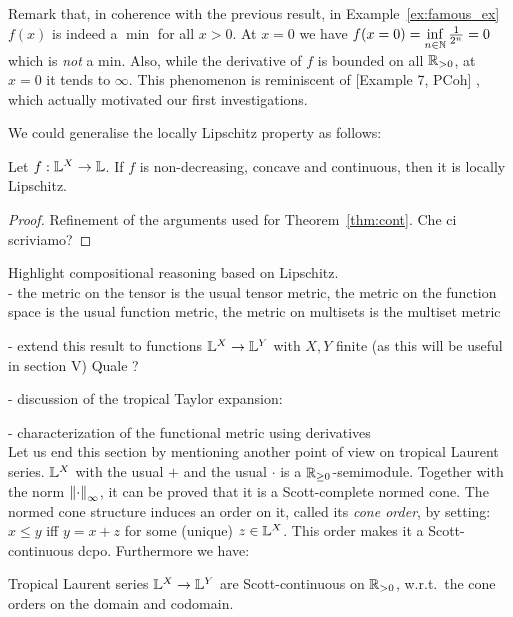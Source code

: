 Remark that, in coherence with the previous result, in Example~\ref{ex:famous_ex} $f(x)$ is indeed a $\min$ for all $x>0$.
At $x=0$ we have $f(x=0)=\inf\limits_{n\in\mathbb{N}} \frac{1}{2^n}=0$ which is \emph{not} a min.
Also, while the derivative of $f$ is bounded on all $\mathbb{R}_{>0}$, at $x=0$ it tends to $\infty$.
This phenomenon is reminiscent of [Example 7, PCoh]
, which actually motivated our first investigations.

We could generalise the locally Lipschitz property as follows:
\begin{theorem}
 Let $f:\mathbb{L}^X\to\mathbb{L}$.
 If $f$ is non-decreasing, concave and continuous, then it is locally Lipschitz.
\end{theorem}
\begin{proof}
 Refinement of the arguments used for Theorem~\ref{thm:cont}.
 {\color{red}Che ci scriviamo?}
\end{proof}

Highlight compositional reasoning based on Lipschitz.\\

- the metric on the tensor is the usual tensor metric, the metric on the function space is the usual function metric, the metric on multisets is the multiset metric

{\color{red}
- extend this result to functions $\mathbb{L}^{X}\to \mathbb{L}^{Y}$ with $X,Y$ finite (as this will be useful in section V) Quale ?} 



- discussion of the tropical Taylor expansion: 


- characterization of the functional metric using derivatives\\

Let us end this section by mentioning another point of view on tropical Laurent series.
$\mathbb{L}^X$ with the usual $+$ and the usual $\cdot$ is a $\mathbb{R}_{\geq0}$-semimodule.
Together with the norm $\left\lVert\cdot\right\rVert_\infty$, it can be proved that it is a Scott-complete normed cone.
The normed cone structure induces an order on it, called its \emph{cone order}, by setting:
$x\leq y$ iff $y=x+z$ for some (unique) $z\in\mathbb{L}^X$.
This order makes it a Scott-continuous dcpo.
Furthermore we have:

\begin{proposition}
  Tropical Laurent series $\mathbb{L}^X\to\mathbb{L}^Y$ are Scott-continuous on $\mathbb{R}_{>0}$, w.r.t.\ the cone orders on the domain and codomain.
\end{proposition}
